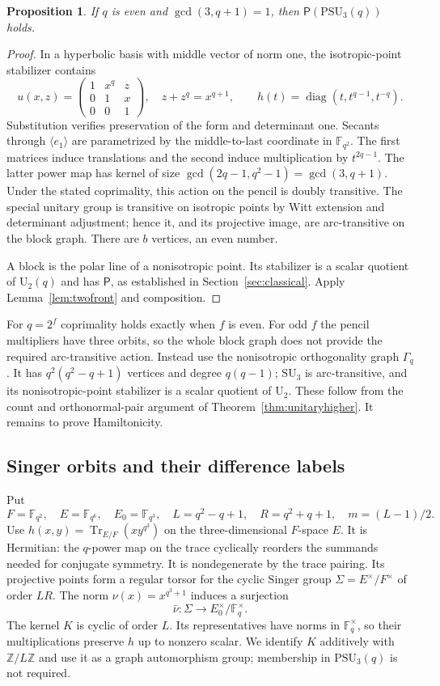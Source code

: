 \documentclass[11pt]{article}
\newtheorem{proposition}[theorem]{Proposition}
\theoremstyle{definition}
\newcommand{\F}{\mathbb F}
\newcommand{\Z}{\mathbb Z}
\newcommand{\Pp}{\mathsf P}
\newcommand{\SU}{\mathrm{SU}}
\newcommand{\PSU}{\mathrm{PSU}}
\newcommand{\U}{\mathrm U}
\newcommand{\Tr}{\operatorname{Tr}}
\newcommand{\diag}{\operatorname{diag}}
\begin{document}
\begin{proposition}\label{prop:unital}
If $q$ is even and $\gcd(3,q+1)=1$, then $\Pp(\PSU_3(q))$ holds.
\end{proposition}
\begin{proof}
In a hyperbolic basis with middle vector of norm one, the isotropic-point stabilizer contains
\[
u(x,z)=\begin{pmatrix}1&x^q&z\\0&1&x\\0&0&1\end{pmatrix},\quad
z+z^q=x^{q+1},\qquad h(t)=\diag(t,t^{q-1},t^{-q}).
\]
Substitution verifies preservation of the form and determinant one. Secants through $\langle e_1\rangle$ are parametrized by the middle-to-last coordinate in $\F_{q^2}$. The first matrices induce translations and the second induce multiplication by $t^{2q-1}$. The latter power map has kernel of size $\gcd(2q-1,q^2-1)=\gcd(3,q+1)$. Under the stated coprimality, this action on the pencil is doubly transitive. The special unitary group is transitive on isotropic points by Witt extension and determinant adjustment; hence it, and its projective image, are arc-transitive on the block graph. There are $b$ vertices, an even number.

A block is the polar line of a nonisotropic point. Its stabilizer is a scalar quotient of $\U_2(q)$ and has $\Pp$, as established in Section~\ref{sec:classical}. Apply Lemma~\ref{lem:twofront} and composition.
\end{proof}
For $q=2^f$ coprimality holds exactly when $f$ is even. For odd $f$ the pencil multipliers have three orbits, so the whole block graph does not provide the required arc-transitive action. Instead use the nonisotropic orthogonality graph $\Gamma_q$. It has $q^2(q^2-q+1)$ vertices and degree $q(q-1)$; $\SU_3$ is arc-transitive, and its nonisotropic-point stabilizer is a scalar quotient of $\U_2$. These follow from the count and orthonormal-pair argument of Theorem~\ref{thm:unitaryhigher}. It remains to prove Hamiltonicity.

\subsection{Singer orbits and their difference labels}
Put
\[
F=\F_{q^2},\quad E=\F_{q^6},\quad E_0=\F_{q^3},\quad
L=q^2-q+1,\quad R=q^2+q+1,\quad m=(L-1)/2.
\]
Use $h(x,y)=\Tr_{E/F}(xy^{q^3})$ on the three-dimensional $F$-space $E$. It is Hermitian: the $q$-power map on the trace cyclically reorders the summands needed for conjugate symmetry. It is nondegenerate by the trace pairing. Its projective points form a regular torsor for the cyclic Singer group $\Sigma=E^\times/F^\times$ of order $LR$. The norm $\nu(x)=x^{q^3+1}$ induces a surjection
\[
\bar\nu:\Sigma\longrightarrow E_0^\times/\F_q^\times.
\]
The kernel $K$ is cyclic of order $L$. Its representatives have norms in $\F_q^\times$, so their multiplications preserve $h$ up to nonzero scalar. We identify $K$ additively with $\Z/L\Z$ and use it as a graph automorphism group; membership in $\PSU_3(q)$ is not required.
\end{document}
